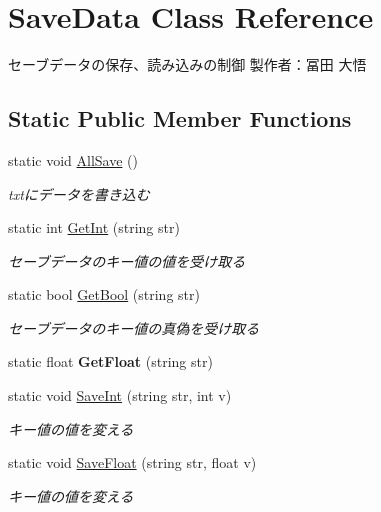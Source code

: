 \hypertarget{class_save_data}{}\section{Save\+Data Class Reference}
\label{class_save_data}


セーブデータの保存、読み込みの制御 製作者：冨田 大悟  


\subsection*{Static Public Member Functions}
\begin{DoxyCompactItemize}
\item 
static void \hyperlink{class_save_data_a0e53b6d48717b1ee274041ed6e4a2cbe}{All\+Save} ()
\begin{DoxyCompactList}\small\item\em txtにデータを書き込む \end{DoxyCompactList}\item 
static int \hyperlink{class_save_data_a83d6911b0372d640f07eaa9b08d4be7e}{Get\+Int} (string str)
\begin{DoxyCompactList}\small\item\em セーブデータのキー値の値を受け取る \end{DoxyCompactList}\item 
static bool \hyperlink{class_save_data_a5f30e9dfb2fde8be2780d6e79390ed92}{Get\+Bool} (string str)
\begin{DoxyCompactList}\small\item\em セーブデータのキー値の真偽を受け取る \end{DoxyCompactList}\item 
\mbox{\label{class_save_data_ad185cbe9664d51bf7c31698511d0232d}} 
static float {\bfseries Get\+Float} (string str)
\item 
static void \hyperlink{class_save_data_a956d2e322deb43baadd0696e89800369}{Save\+Int} (string str, int v)
\begin{DoxyCompactList}\small\item\em キー値の値を変える \end{DoxyCompactList}\item 
static void \hyperlink{class_save_data_acd052c8897eca3a42ac1b8b75b99e50a}{Save\+Float} (string str, float v)
\begin{DoxyCompactList}\small\item\em キー値の値を変える \end{DoxyCompactList}\item 

\end{DoxyCompactItemize}
